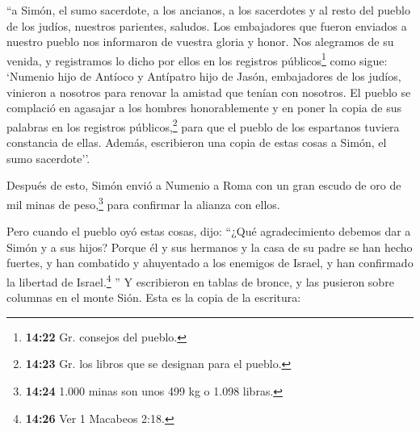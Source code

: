 ``a Simón, el sumo sacerdote, a los ancianos, a los sacerdotes y al
resto del pueblo de los judíos, nuestros parientes, saludos.
 Los embajadores que fueron enviados a nuestro pueblo nos
informaron de vuestra gloria y honor. Nos alegramos de su venida,
 y registramos lo dicho por ellos en los registros
públicos\footnote{\textbf{14:22} Gr. consejos del pueblo.} como sigue:
`Numenio hijo de Antíoco y Antípatro hijo de Jasón, embajadores de los
judíos, vinieron a nosotros para renovar la amistad que tenían con
nosotros.  El pueblo se complació en agasajar a los
hombres honorablemente y en poner la copia de sus palabras en los
registros públicos,\footnote{\textbf{14:23} Gr. los libros que se
  designan para el pueblo.} para que el pueblo de los espartanos tuviera
constancia de ellas. Además, escribieron una copia de estas cosas a
Simón, el sumo sacerdote''.

 Después de esto, Simón envió a Numenio a Roma con un
gran escudo de oro de mil minas de peso,\footnote{\textbf{14:24} 1.000
  minas son unos 499 kg o 1.098 libras.} para confirmar la alianza con
ellos.

 Pero cuando el pueblo oyó estas cosas, dijo: ``¿Qué
agradecimiento debemos dar a Simón y a sus hijos?  Porque
él y sus hermanos y la casa de su padre se han hecho fuertes, y han
combatido y ahuyentado a los enemigos de Israel, y han confirmado la
libertad de Israel.\footnote{\textbf{14:26} Ver 1 Macabeos 2:18.} ''
 Y escribieron en tablas de bronce, y las pusieron sobre
columnas en el monte Sión. Esta es la copia de la escritura:

